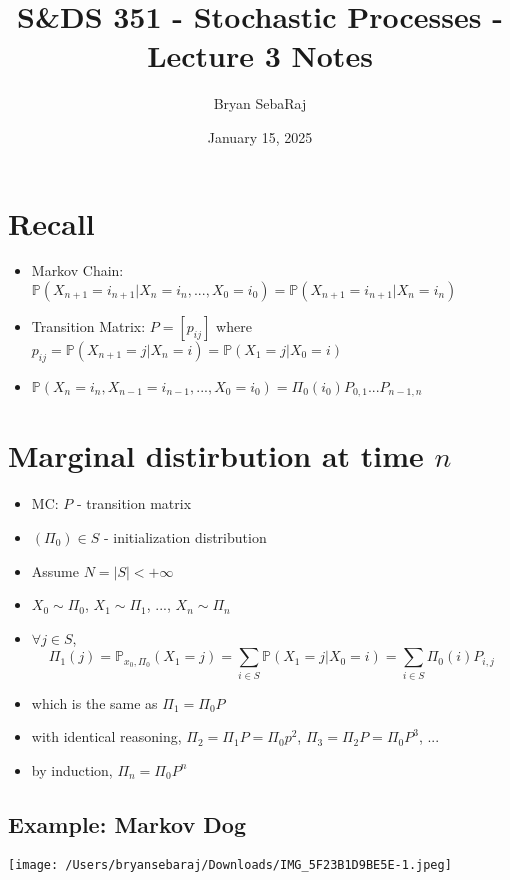 \documentclass{article}
\title{S\&DS 351 - Stochastic Processes - Lecture 3 Notes}
\author{Bryan SebaRaj}
\date{January 15, 2025}
\begin{document}
\maketitle

\section{Recall}

\begin{itemize}
    \item Markov Chain: $\mathbb{P}(X_{n+1}=i_{n+1} | X_{n}=i_n, ..., X_0 = i_0)=\mathbb{P}(X_{n+1}=i_{n+1} | X_n=i_n)$
\item Transition Matrix: $P = [p_{ij}]$ where $p_{ij} = \mathbb{P}(X_{n+1}=j | X_n=i)=\mathbb{P}(X_1=j | X_0 = i)$
    \item $\mathbb{P}(X_n=i_n, X_{n-1}=i_{n-1}, ... , X_0=i_0)=\Pi_{0}(i_0)P_{0,1} ... P_{n-1,n}$

\end{itemize}

\section{Marginal distirbution at time $n$}

\begin{itemize}
    \item MC: $P$ - transition matrix
    \item $(\Pi_0) \in S$ - initialization distribution
\item Assume $N=|S| < + \infty$
\item $X_0 \sim \Pi_0$, $X_1 \sim \Pi_1$, ..., $X_n \sim \Pi_n$
\item $\forall j \in S$, $$\Pi_1(j)=\mathbb{P}_{x_0, \Pi_0}(X_1 = j) = \sum_{i \in S}\mathbb{P}(X_1=j | X_0 = i) = \sum_{i \in S}\Pi_0 (i)P_{i,j}$$
\item which is the same as $\Pi_1=\Pi_0 P$
\item with identical reasoning, $\Pi_2 = \Pi_1 P=\Pi_0 p^2$, $\Pi_3 = \Pi_2 P = \Pi_0 P^3$, ...
\item by induction, $\Pi_n = \Pi_{0} P^n$
\end{itemize}

\subsection{Example: Markov Dog}

\texttt{[image: /Users/bryansebaraj/Downloads/IMG\_5F23B1D9BE5E-1.jpeg]}
\end{document}
